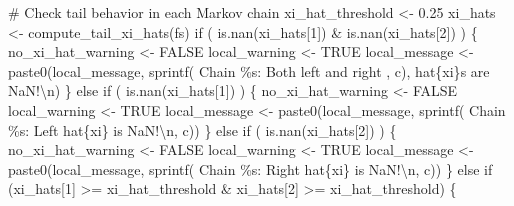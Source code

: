 \documentclass[
  letterpaper,
  DIV=11,
  numbers=noendperiod]{scrartcl}
\newenvironment{Shaded}{\begin{snugshade}}{\end{snugshade}}
\newcommand{\CharTok}[1]{\textcolor[rgb]{0.13,0.47,0.30}{#1}}
\newcommand{\CommentTok}[1]{\textcolor[rgb]{0.37,0.37,0.37}{#1}}
\newcommand{\ControlFlowTok}[1]{\textcolor[rgb]{0.00,0.23,0.31}{#1}}
\newcommand{\DecValTok}[1]{\textcolor[rgb]{0.68,0.00,0.00}{#1}}
\newcommand{\FloatTok}[1]{\textcolor[rgb]{0.68,0.00,0.00}{#1}}
\newcommand{\KeywordTok}[1]{\textcolor[rgb]{0.00,0.23,0.31}{#1}}
\newcommand{\NormalTok}[1]{\textcolor[rgb]{0.00,0.23,0.31}{#1}}
\newcommand{\OperatorTok}[1]{\textcolor[rgb]{0.37,0.37,0.37}{#1}}
\newcommand{\SpecialCharTok}[1]{\textcolor[rgb]{0.37,0.37,0.37}{#1}}
\newcommand{\StringTok}[1]{\textcolor[rgb]{0.13,0.47,0.30}{#1}}
\begin{document}
\begin{Shaded}
\begin{Highlighting}[]
      \CommentTok{\# Check tail behavior in each Markov chain}
\NormalTok{      xi\_hat\_threshold }\OperatorTok{\textless{}{-}} \FloatTok{0.25}
\NormalTok{      xi\_hats }\OperatorTok{\textless{}{-}}\NormalTok{ compute\_tail\_xi\_hats(fs)}
      \ControlFlowTok{if}\NormalTok{ ( }\KeywordTok{is}\NormalTok{.nan(xi\_hats[}\DecValTok{1}\NormalTok{]) }\OperatorTok{\&} \KeywordTok{is}\NormalTok{.nan(xi\_hats[}\DecValTok{2}\NormalTok{]) ) \{}
\NormalTok{        no\_xi\_hat\_warning }\OperatorTok{\textless{}{-}}\NormalTok{ FALSE}
\NormalTok{        local\_warning }\OperatorTok{\textless{}{-}}\NormalTok{ TRUE}
\NormalTok{        local\_message }\OperatorTok{\textless{}{-}}
\NormalTok{          paste0(local\_message,}
\NormalTok{                 sprintf(}\StringTok{\textquotesingle{}  Chain }\SpecialCharTok{\%s}\StringTok{: Both left and right \textquotesingle{}}\NormalTok{, c),}
                         \StringTok{\textquotesingle{}hat}\SpecialCharTok{\{xi\}}\StringTok{s are NaN!}\CharTok{\textbackslash{}n}\StringTok{\textquotesingle{}}\NormalTok{)}
\NormalTok{      \}}
      \ControlFlowTok{else} \ControlFlowTok{if}\NormalTok{ ( }\KeywordTok{is}\NormalTok{.nan(xi\_hats[}\DecValTok{1}\NormalTok{]) ) \{}
\NormalTok{        no\_xi\_hat\_warning }\OperatorTok{\textless{}{-}}\NormalTok{ FALSE}
\NormalTok{        local\_warning }\OperatorTok{\textless{}{-}}\NormalTok{ TRUE}
\NormalTok{        local\_message }\OperatorTok{\textless{}{-}}
\NormalTok{          paste0(local\_message,}
\NormalTok{                 sprintf(}\StringTok{\textquotesingle{}  Chain }\SpecialCharTok{\%s}\StringTok{: Left hat}\SpecialCharTok{\{xi\}}\StringTok{ is NaN!}\CharTok{\textbackslash{}n}\StringTok{\textquotesingle{}}\NormalTok{, c))}
\NormalTok{      \} }\ControlFlowTok{else} \ControlFlowTok{if}\NormalTok{ ( }\KeywordTok{is}\NormalTok{.nan(xi\_hats[}\DecValTok{2}\NormalTok{]) ) \{}
\NormalTok{        no\_xi\_hat\_warning }\OperatorTok{\textless{}{-}}\NormalTok{ FALSE}
\NormalTok{        local\_warning }\OperatorTok{\textless{}{-}}\NormalTok{ TRUE}
\NormalTok{        local\_message }\OperatorTok{\textless{}{-}}
\NormalTok{          paste0(local\_message,}
\NormalTok{                 sprintf(}\StringTok{\textquotesingle{}  Chain }\SpecialCharTok{\%s}\StringTok{: Right hat}\SpecialCharTok{\{xi\}}\StringTok{ is NaN!}\CharTok{\textbackslash{}n}\StringTok{\textquotesingle{}}\NormalTok{, c))}
\NormalTok{      \} }\ControlFlowTok{else} \ControlFlowTok{if}\NormalTok{ (xi\_hats[}\DecValTok{1}\NormalTok{] }\OperatorTok{\textgreater{}=}\NormalTok{ xi\_hat\_threshold }\OperatorTok{\&} 
\NormalTok{          xi\_hats[}\DecValTok{2}\NormalTok{] }\OperatorTok{\textgreater{}=}\NormalTok{ xi\_hat\_threshold) \{}

\end{Highlighting}
\end{Shaded}
\end{document}
